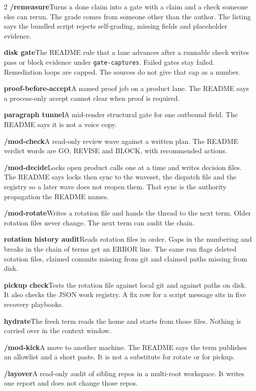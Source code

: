 \documentclass[10pt]{article}
\begin{document}
\begin{multicols}{2}
\textbf{/remeasure}\quad Turns a done claim into a gate with a claim and a check someone else can rerun. The grade comes from someone other than the author. The listing says the bundled script rejects self-grading, missing fields and placeholder evidence.

\textbf{disk gate}\quad The README rule that a lane advances after a runnable check writes pass or block evidence under \texttt{gate-captures}. Failed gates stay failed. Remediation loops are capped. The sources do not give that cap as a number.

\textbf{proof-before-accept}\quad A named proof job on a product lane. The README says a process-only accept cannot clear when proof is required.

\textbf{paragraph tunnel}\quad A mid-render structural gate for one outbound field. The README says it is not a voice copy.

\textbf{/mod-check}\quad A read-only review wave against a written plan. The README verdict words are GO, REVISE and BLOCK, with recommended actions.

\textbf{/mod-decide}\quad Locks open product calls one at a time and writes decision files. The README says locks then sync to the waveset, the dispatch file and the registry so a later wave does not reopen them. That sync is the authority propagation the README names.

\textbf{/mod-rotate}\quad Writes a rotation file and hands the thread to the next term. Older rotation files never change. The next term can audit the chain.

\textbf{rotation history audit}\quad Reads rotation files in order. Gaps in the numbering and breaks in the chain of terms get an ERROR line. The same run flags deleted rotation files, claimed commits missing from git and claimed paths missing from disk.

\textbf{pickup check}\quad Tests the rotation file against local git and against paths on disk. It also checks the JSON work registry. A fix row for a script message sits in five recovery playbooks.

\textbf{hydrate}\quad The fresh term reads the home and starts from those files. Nothing is carried over in the context window.

\textbf{/mod-kick}\quad A move to another machine. The README says the term publishes an allowlist and a short paste. It is not a substitute for rotate or for pickup.

\textbf{/layover}\quad A read-only audit of sibling repos in a multi-root workspace. It writes one report and does not change those repos.


\end{multicols}
\end{document}
